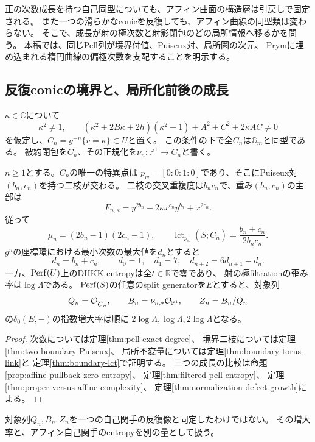 \documentclass[11pt,a4paper]{ltjsarticle}
\begin{document}
正の次数成長を持つ自己同型についても、アフィン曲面の構造層は引戻しで固定される。
また一つの滑らかなconicを反復しても、アフィン曲線の同型類は変わらない。
そこで、成長が射の極次数と射影閉包のどの局所情報へ移るかを問う。
本稿では、同じPell列が境界付値、Puiseux対、局所圏の次元、
Prymに埋め込まれる楕円曲線の偏極次数を支配することを明示する。

\subsection{反復conicの境界と、局所化前後の成長}
$\kappa\in\mathbb C$について
\begin{equation}\label{eq:boundary-paper-admissible}
 \kappa^2\ne1,\qquad
 (\kappa^2+2B\kappa+2h)(\kappa^2-1)+A^2+C^2+2\kappa AC\ne0
\end{equation}
を仮定し、$C_n=g^{-n}\{v=\kappa\}\subset U$と置く。
この条件の下で全$C_n$は$\mathbb G_m$と同型である。
被約閉包を$\overline C_n$、その正規化を$\nu_n:\mathbb P^1\to\overline C_n$と書く。

\begin{theorem}[境界二枝と三つの測定値]\label{thm:boundary-paper-growth}
$n\ge1$とする。$\overline C_n$の唯一の特異点は
$p_w=[0:0:1:0]$であり、そこにPuiseux対$(b_n,c_n)$を持つ二枝が交わる。
二枝の交叉重複度は$b_nc_n$で、重み$(b_n,c_n)$の主部は
\[
 F_{n,\kappa}=y^{2b_n}-2\kappa x^{c_n}y^{b_n}+x^{2c_n}.
\]
従って
\[
 \mu_n=(2b_n-1)(2c_n-1),\qquad
 \operatorname{lct}_{p_w}(S;\overline C_n)=\frac{b_n+c_n}{2b_nc_n}.
\]
$g^n$の座標環における最小次数の最大値を$d_n$とすると
\[
 d_n=b_n+c_n,\qquad d_0=1,\quad d_1=7,\quad
 d_{n+2}=6d_{n+1}-d_n.
\]
一方、$\operatorname{Perf}(U)$上のDHKK entropyは全$t\in\mathbb R$で零であり、
射の極filtrationの歪み率は$\log\Lambda$である。
$\operatorname{Perf}(S)$の任意のsplit generatorを$E$とすると、対象列
\[
 Q_n=\mathcal O_{\overline C_n},\qquad B_n=\nu_{n,*}\mathcal O_{\mathbb P^1},
 \qquad Z_n=B_n/Q_n
\]
の$\delta_0(E,-)$の指数増大率は順に
$2\log\Lambda,\log\Lambda,2\log\Lambda$となる。
\end{theorem}
\begin{proof}
次数については定理\ref{thm:pell-exact-degree}、
境界二枝については定理\ref{thm:two-boundary-Puiseux}、
局所不変量については定理\ref{thm:boundary-torus-link}と
定理\ref{thm:boundary-lct}で証明する。
三つの成長の比較は命題\ref{prop:affine-pullback-zero-entropy}、
定理\ref{thm:filtered-pell-entropy}、
定理\ref{thm:proper-versus-affine-complexity}、
定理\ref{thm:normalization-defect-growth}による。
\end{proof}
対象列$Q_n,B_n,Z_n$を一つの自己関手の反復像と同定したわけではない。
その増大率と、アフィン自己関手のentropyを別の量として扱う。
\end{document}
